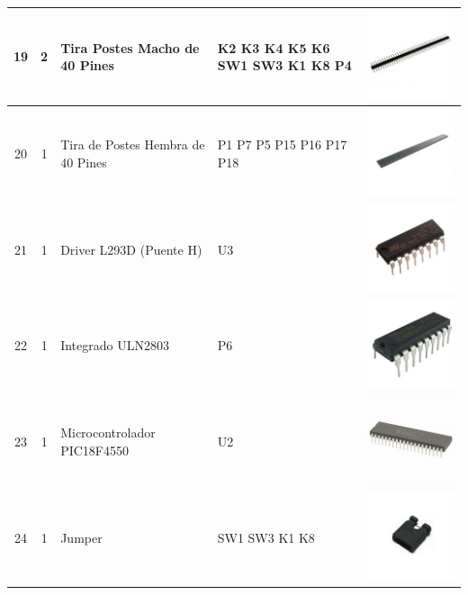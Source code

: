 \begin{tabular}{|c|c|l|p{5cm}|c|}
	19   & 2        & Tira Postes Macho de 40 Pines     & K2 K3 K4 K5 K6 SW1 SW3 K1 K8 P4     & \includegraphics[width=0.05\linewidth]{Componentes/pinesmacho}             \\[0.5cm] \hline
	20   & 1        & Tira de Postes Hembra de 40 Pines & P1 P7 P5 P15 P16 P17 P18            & \includegraphics[width=0.05\linewidth]{Componentes/pineshembra}            \\[0.5cm] \hline
	21   & 1        & Driver L293D (Puente H)           & U3                                  & \includegraphics[width=0.05\linewidth]{Componentes/L293D}                  \\[0.5cm] \hline
	22   & 1        & Integrado ULN2803                 & P6                                  & \includegraphics[width=0.05\linewidth]{Componentes/uln2803}                \\[0.5cm] \hline
	23   & 1        & Microcontrolador PIC18F4550       & U2                                  & \includegraphics[width=0.05\linewidth]{Componentes/pic18f4550}             \\[0.5cm] \hline
	24   & 1        & Jumper                            & SW1 SW3 K1 K8                       & \includegraphics[width=0.05\linewidth]{Componentes/Jumper}                 \\[0.5cm] \hline
\end{tabular} 